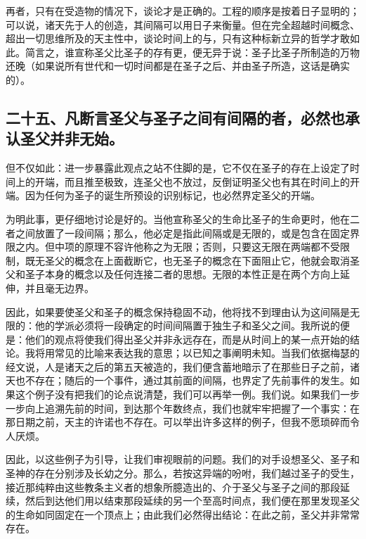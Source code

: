 再者，只有在受造物的情况下，谈论才是正确的。工程的顺序是按着日子显明的；可以说，诸天先于人的创造，其间隔可以用日子来衡量。但在完全超越时间概念、超出一切思维所及的天主性中，谈论时间上的与，只有这种标新立异的哲学才敢如此。简言之，谁宣称圣父比圣子的存有更，便无异于说：圣子比圣子所制造的万物还晚（如果说所有世代和一切时间都是在圣子之后、并由圣子所造，这话是确实的）。\par


\subsection{二十五、凡断言圣父与圣子之间有间隔的者，必然也承认圣父并非无始。}

但不仅如此：进一步暴露此观点之站不住脚的是，它不仅在圣子的存在上设定了时间上的开端，而且推至极致，连圣父也不放过，反倒证明圣父也有其在时间上的开端。因为任何为圣子的诞生所预设的识别标记，也必然界定圣父的开端。\par

为明此事，更仔细地讨论是好的。当他宣称圣父的生命比圣子的生命更时，他在二者之间放置了一段间隔；那么，他必定是指此间隔或是无限的，或是包含在固定界限之内。但中项的原理不容许他称之为无限；否则，只要这无限在两端都不受限制，既无圣父的概念在上面截断它，也无圣子的概念在下面阻止它，他就会取消圣父和圣子本身的概念以及任何连接二者的思想。无限的本性正是在两个方向上延伸，并且毫无边界。\par

因此，如果要使圣父和圣子的概念保持稳固不动，他将找不到理由认为这间隔是无限的：他的学派必须将一段确定的时间间隔置于独生子和圣父之间。我所说的便是：他们的观点将使我们得出圣父并非永远存在，而是从时间上的某一点开始的结论。我将用常见的比喻来表达我的意思；以已知之事阐明未知。当我们依据梅瑟的经文说，人是诸天之后的第五天被造的，我们便含蓄地暗示了在那些日子之前，诸天也不存在；随后的一个事件，通过其前面的间隔，也界定了先前事件的发生。如果这个例子没有把我们的论点说清楚，我们可以再举一例。我们说。如果我们一步一步向上追溯先前的时间，到达那个年数终点，我们也就牢牢把握了一个事实：在那日期之前，天主的许诺也不存在。可以举出许多这样的例子，但我不愿琐碎而令人厌烦。\par

因此，以这些例子为引导，让我们审视眼前的问题。我们的对手设想圣父、圣子和圣神的存在分别涉及长幼之分。那么，若按这异端的吩咐，我们越过圣子的受生，接近那纯粹由这些教条主义者的想象所臆造出的、介于圣父与圣子之间的那段延续，然后到达他们用以结束那段延续的另一个至高时间点，我们便在那里发现圣父的生命如同固定在一个顶点上；由此我们必然得出结论：在此之前，圣父并非常常存在。\par

